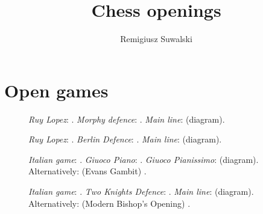 \documentclass[a4paper]{extarticle}
\begin{document}
\author{Remigiusz Suwalski}
\title{Chess openings}
\maketitle
\section{Open games}
\begin{figure}[H]
\begin{minipage}[b]{.246\linewidth}
\begin{framed}
\raggedright
\newgame
\emph{Ruy Lopez}: .
\emph{Morphy defence}: .
\emph{Main line}:  (diagram).
\begin{center}
\scalebox{0.7}{\showboard}
\end{center}
\end{framed}
\end{minipage}
\begin{minipage}[b]{.246\linewidth}
\begin{framed}
\raggedright
\newgame
\emph{Ruy Lopez}: .
\emph{Berlin Defence}: .
\emph{Main line}:  (diagram).
\begin{center}
\scalebox{0.7}{\showboard}
\end{center}
\end{framed}
\end{minipage}
\begin{minipage}[b]{.246\linewidth}
\begin{framed}
\raggedright
\newgame
\emph{Italian game}: .
\emph{Giuoco Piano}: .
\emph{Giuoco Pianissimo}:  (diagram).
Alternatively:  (Evans Gambit) .
\begin{center}
\scalebox{0.7}{\showboard}
\end{center}
\end{framed}
\end{minipage}
\begin{minipage}[b]{.246\linewidth}
\begin{framed}
\raggedright
\newgame
\emph{Italian game}: .
\emph{Two Knights Defence}: .
\emph{Main line}:  (diagram).
Alternatively:  (Modern Bishop’s Opening) .
\begin{center}
\scalebox{0.7}{\showboard}
\end{center}
\end{framed}
\end{minipage}
\end{figure}
\end{document}
